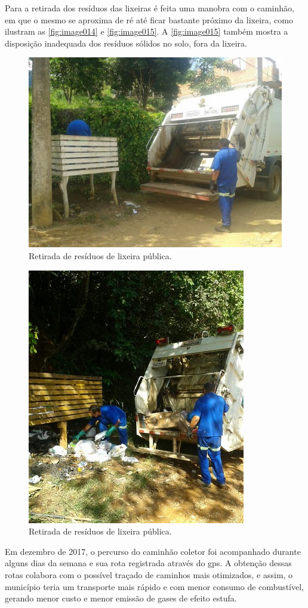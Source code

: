 Para a retirada dos resíduos das lixeiras é feita uma manobra com o caminhão, em que o mesmo se aproxima de ré até ficar bastante próximo da lixeira, como ilustram as \autoref{fig:image014} e \autoref{fig:image015}. A \autoref{fig:image015} também mostra a disposição inadequada dos resíduos sólidos no solo, fora da lixeira.

\begin{figure}
	\centering
	\includegraphics[width=0.7\linewidth]{produtos/prodtres/image014}
	\caption{Retirada de resíduos de lixeira pública.}
	\label{fig:image014}
\end{figure}

\begin{figure}
	\centering
	\includegraphics[width=0.50\linewidth]{produtos/prodtres/image015}
	\caption{Retirada de resíduos de lixeira pública.}
	\label{fig:image015}
\end{figure}

Em dezembro de 2017, o percurso do caminhão coletor foi acompanhado durante alguns dias da semana e sua rota registrada através do \gls{gps}. A obtenção dessas rotas colabora com o possível traçado de caminhos mais otimizados, e assim, o município teria um transporte mais rápido e com menor consumo de combustível, gerando menor custo e menor emissão de gases de efeito estufa.

